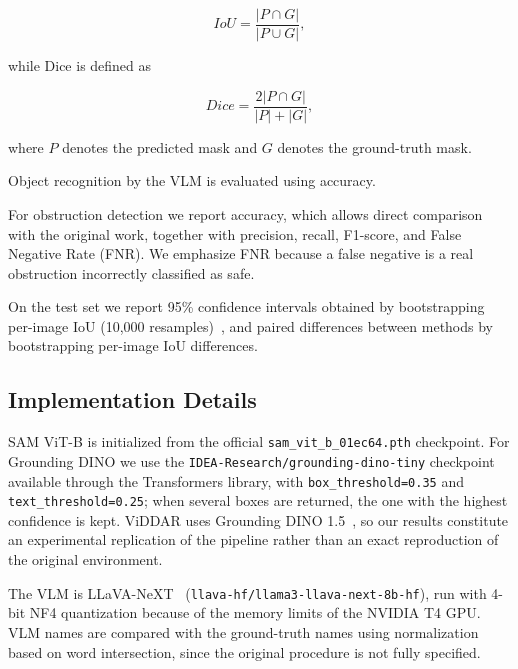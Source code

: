 \documentclass[conference]{IEEEtran}
\begin{document}
\begin{equation}
IoU =
\frac{|P \cap G|}
{|P \cup G|},
\end{equation}

while Dice is defined as

\begin{equation}
Dice =
\frac{2|P \cap G|}
{|P| + |G|},
\end{equation}

where $P$ denotes the predicted mask and $G$ denotes the ground-truth mask.

Object recognition by the VLM is evaluated using accuracy.

For obstruction detection we report accuracy, which allows direct comparison with the original work, together with precision, recall, F1-score, and False Negative Rate (FNR). We emphasize FNR because a false negative is a real obstruction incorrectly classified as safe.

On the test set we report 95\% confidence intervals obtained by bootstrapping per-image IoU (10{,}000 resamples)~\cite{bootstrap}, and paired differences between methods by bootstrapping per-image IoU differences.


\subsection{Implementation Details}

SAM ViT-B is initialized from the official \texttt{sam\_vit\_b\_01ec64.pth} checkpoint. For Grounding DINO we use the \texttt{IDEA-Research/grounding-dino-tiny} checkpoint available through the Transformers library, with \texttt{box\_threshold=0.35} and \texttt{text\_threshold=0.25}; when several boxes are returned, the one with the highest confidence is kept. ViDDAR uses Grounding DINO 1.5~\cite{groundingdino15}, so our results constitute an experimental replication of the pipeline rather than an exact reproduction of the original environment.

The VLM is LLaVA-NeXT~\cite{llavanext} (\texttt{llava-hf/llama3-llava-next-8b-hf}), run with 4-bit NF4 quantization because of the memory limits of the NVIDIA T4 GPU. VLM names are compared with the ground-truth names using normalization based on word intersection, since the original procedure is not fully specified.
\end{document}
